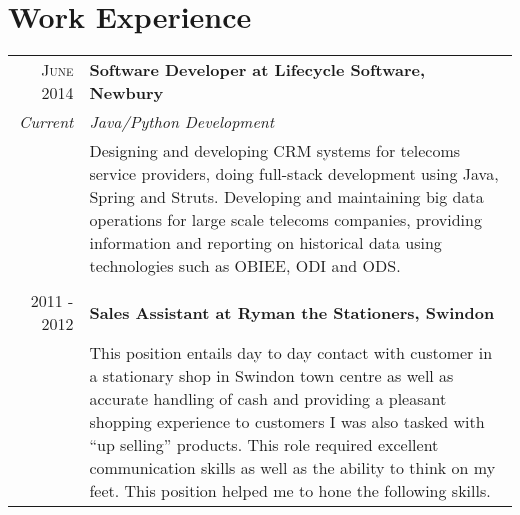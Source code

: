 \section{Work Experience}
\begin{tabular}{r|p{11cm}}

	\textsc{June 2014} & \textbf{Software Developer at Lifecycle Software, Newbury} \\
	\emph{Current} & \emph{Java/Python Development} \\
	&\footnotesize{Designing and developing CRM systems for telecoms service providers, doing full-stack development using Java, Spring and Struts. Developing and maintaining big data operations for large scale telecoms companies, providing information and reporting on historical data using technologies such as OBIEE, ODI and ODS.} \\

	\multicolumn{2}{c}{} \\

	\textsc{2011 - 2012} & \textbf{Sales Assistant at Ryman the Stationers, Swindon} \\
	&\footnotesize{This position entails day to day contact with customer in a stationary shop in Swindon town centre as well as accurate handling of cash and providing a pleasant shopping experience to customers I was also tasked with “up selling” products. This role required excellent communication skills as well as the ability to think on my feet. This position helped me to hone the following skills.} \\

\end{tabular}